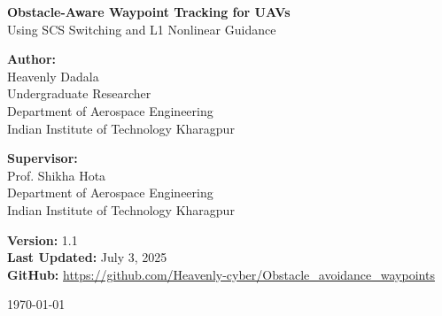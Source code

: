 \begin{titlepage}
    \centering
    \vspace*{2.5cm}

    {\Huge \bfseries Obstacle-Aware Waypoint Tracking for UAVs}\\[0.4cm]
    {\Large Using SCS Switching and L1 Nonlinear Guidance}\\[1.8cm]

    \begin{flushleft}
    \textbf{Author:} \\[0.2cm]
    Heavenly Dadala \\
    Undergraduate Researcher \\
    Department of Aerospace Engineering \\
    Indian Institute of Technology Kharagpur
    \end{flushleft}

    \vspace{1.3cm}

    \begin{flushleft}
    \textbf{Supervisor:} \\[0.2cm]
    Prof. Shikha Hota \\
    Department of Aerospace Engineering \\
    Indian Institute of Technology Kharagpur
    \end{flushleft}

    \vfill

    \begin{flushleft}
    \textbf{Version:} 1.1 \\
    \textbf{Last Updated:} July 3, 2025 \\
    \textbf{GitHub:} \url{https://github.com/Heavenly-cyber/Obstacle_avoidance_waypoints}
    \end{flushleft}

    \vspace{1.2cm}
    \begin{center}
    \large \today
    \end{center}
\end{titlepage}

